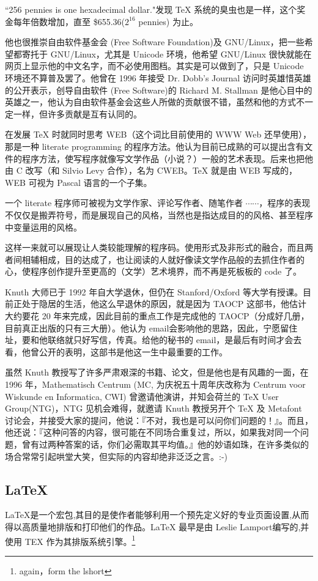 \documentclass[11pt,oneside]{book}
\begin{document}
\begin{common-format}
``256 pennies is one hexadecimal dollar."发现 TeX 系统的臭虫也是一样，这个奖金每年倍数增加，直至 \$655.36($ 2^{16}$ pennies) 为止。

他也很推崇自由软件基金会 (Free Software Foundation)及 GNU/Linux，把一些希望都寄托于 GNU/Linux，尤其是 Unicode 环境，他希望 GNU/Linux 很快就能在网页上显示他的中文名字，而不必使用图档。其实是可以做到了，只是 Unicode 环境还不算普及罢了。他曾在 1996 年接受 Dr. Dobb's Journal 访问时英雄惜英雄的公开表示，创导自由软件 (Free Software)的 Richard M. Stallman 是他心目中的英雄之一，他认为自由软件基金会这些人所做的贡献很不错，虽然和他的方式不一定一样，但许多贡献是互有认同的。

在发展 TeX 时就同时思考 WEB（这个词比目前使用的 WWW Web 还早使用），那是一种 literate programming 的程序方法。他认为目前已成熟的可以提出含有文件的程序方法，使写程序就像写文学作品（小说？）一般的艺术表现。后来也把他由 C 改写（和 Silvio Levy 合作），名为 CWEB。TeX 就是由 WEB 写成的，WEB 可视为 Pascal 语言的一个子集。

一个 literate 程序师可被视为文学作家、评论写作者、随笔作者 $ \cdots\cdots$，程序的表现不仅仅是搬弄符号，而是展现自己的风格，当然也是指达成目的的风格、甚至程序中变量运用的风格。

这样一来就可以展现让人类较能理解的程序码。使用形式及非形式的融合，而且两者间相辅相成，目的达成了，也让阅读的人就好像读文学作品般的去抓住作者的心，使程序创作提升至更高的（文学）艺术境界，而不再是死板板的 code 了。

Knuth 大师已于 1992 年自大学退休，但仍在 Stanford/Oxford 等大学有授课。目前正处于隐居的生活，他这么早退休的原因，就是因为 TAOCP 这部书，他估计大约要花 20 年来完成，因此目前的重点工作是完成他的 TAOCP（分成好几册，目前真正出版的只有三大册）。他认为 email会影响他的思路，因此，宁愿留住址，要和他联络就只好写信，传真。给他的秘书的 email，是最后有时间才会去看，他曾公开的表明，这部书是他这一生中最重要的工作。

虽然 Knuth 教授写了许多严肃艰深的书籍、论文，但是他也是有风趣的一面，在 1996 年，Mathematisch Centrum (MC, 为庆祝五十周年庆改称为 Centrum voor Wiskunde en Informatica, CWI) 曾邀请他演讲，并知会荷兰的 TeX User Group(NTG)，NTG 见机会难得，就邀请 Knuth 教授另开个 TeX 及 Metafont 讨论会，并接受大家的提问，他说：『不对，我也是可以问你们问题的！』。而且，他还说：『这种问答的内容，很可能在不同场合重复过，所以，如果我对同一个问题，曾有过两种答案的话，你们必需取其平均值。』他的妙语如珠，在许多类似的场合常常引起哄堂大笑，但实际的内容却绝非泛泛之言。:-)

\subsection{LaTeX}
LaTeX是一个宏包,其目的是使作者能够利用一个预先定义好的专业页面设置,从而得以高质量地排版和打印他们的作品。LaTeX 最早是由 Leslie Lamport编写的,并使用 TEX 作为其排版系统引擎。\footnote{again，form the lshort}


\end{common-format}
\end{document}
